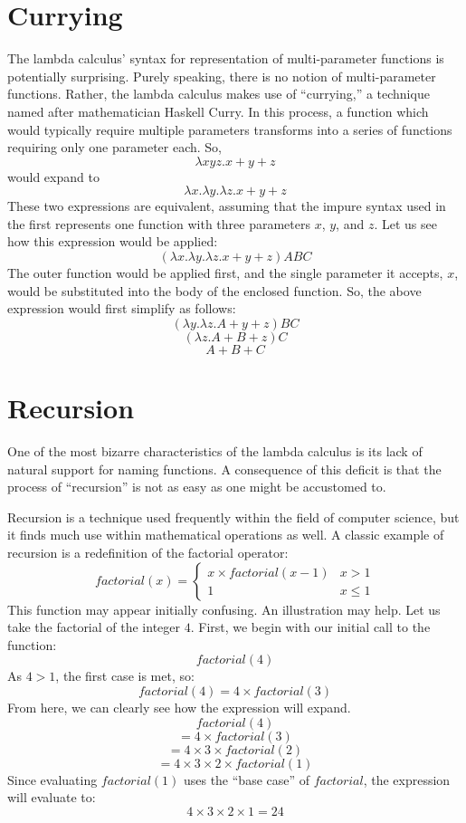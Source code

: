 \documentclass[twocolumn,titlepage]{article}
\begin{document}
\section{Currying}
The lambda calculus' syntax for representation of multi-parameter functions is potentially surprising. Purely speaking, there is no notion of multi-parameter functions. Rather, the lambda calculus makes use of ``currying,'' a technique named after mathematician Haskell Curry. In this process, a function which would typically require multiple parameters transforms into a series of functions requiring only one parameter each. So,
$$\lambda xyz.x+y+z$$
would expand to
$$\lambda x.\lambda y.\lambda z.x+y+z$$
These two expressions are equivalent, assuming that the impure syntax used in the first represents one function with three parameters $x$, $y$, and $z$. Let us see how this expression would be applied:
$$(\lambda x.\lambda y.\lambda z.x+y+z)ABC$$
The outer function would be applied first, and the single parameter it accepts, $x$, would be substituted into the body of the enclosed function. So, the above expression would first simplify as follows:
$$(\lambda y.\lambda z.A+y+z)BC$$
$$(\lambda z.A+B+z)C$$
$$A+B+C$$

\section{Recursion}
One of the most bizarre characteristics of the lambda calculus is its lack of natural support for naming functions. A consequence of this deficit is that the process of ``recursion'' is not as easy as one might be accustomed to.

Recursion is a technique used frequently within the field of computer science, but it finds much use within mathematical operations as well. A classic example of recursion is a redefinition of the factorial operator:
\[
factorial(x)=
\begin{cases}
    x\times factorial(x-1) & x>1 \\
    1 & x\leq 1
\end{cases}
\]
This function may appear initially confusing. An illustration may help. Let us take the factorial of the integer $4$. First, we begin with our initial call to the function:
$$factorial(4)$$
As $4>1$, the first case is met, so:
$$factorial(4)=4\times factorial(3)$$
From here, we can clearly see how the expression will expand.
$$factorial(4)$$
$$=4\times factorial(3)$$
$$=4\times 3\times factorial(2)$$
$$=4\times 3\times 2\times factorial(1)$$
Since evaluating $factorial(1)$ uses the ``base case'' of $factorial$, the expression will evaluate to:
$$4\times 3\times 2\times 1=24$$
\end{document}
